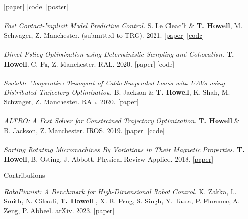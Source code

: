 \documentclass[10pt]{article}
\begin{document}
[\href{https://arxiv.org/abs/2109.04928}{paper}]
[\href{https://github.com/thowell/optimization_dynamics}{code}]
[\href{https://github.com/thowell/cv/blob/master/posters/optimization_dynamics_poster.pdf}{poster}]
\\
\\
\textit{Fast Contact-Implicit Model Predictive Control.} {\color{lightgray} S. Le Cleac'h \&} \textbf{T. Howell}{\color{lightgray}, M. Schwager, Z. Manchester. (submitted to TRO). 2021.}
[\href{https://arxiv.org/abs/2107.05616v2}{paper}]
[\href{https://github.com/thowell/ContactImplicitMPC.jl}{code}]
\\
\\
\textit{Direct Policy Optimization using Deterministic Sampling and Collocation.} \textbf{T. Howell}{\color{lightgray}, C. Fu, Z. Manchester. RAL. 2020.}
[\href{https://arxiv.org/abs/2010.08506v3}{paper}]
[\href{https://github.com/thowell/direct_policy_optimization}{code}]
\\
\\
\textit{Scalable Cooperative Transport of Cable-Suspended Loads with UAVs using Distributed Trajectory Optimization.} {\color{lightgray}B. Jackson \&} \textbf{T. Howell}{\color{lightgray}, K. Shah, M. Schwager, Z. Manchester. RAL. 2020.}
[\href{https://roboticexplorationlab.org/papers/distributed_quads.pdf}{paper}]
\\
\\
\textit{ALTRO: A Fast Solver for Constrained Trajectory Optimization.} \textbf{T. Howell} {\color{lightgray} \& B. Jackson, Z. Manchester. IROS. 2019.}
[\href{https://roboticexplorationlab.org/papers/altro-iros.pdf}{paper}]
[\href{https://github.com/RoboticExplorationLab/TrajectoryOptimization.jl}{code}]
\\
\\
\textit{Sorting Rotating Micromachines By Variations in Their Magnetic Properties.} \textbf{T. Howell}{\color{lightgray}, B. Osting, J. Abbott. Physical Review Applied. 2018.}
[\href{https://journals.aps.org/prapplied/pdf/10.1103/PhysRevApplied.9.054021}{paper}]
\\
\begin{center} Contributions \end{center}
\textit{RoboPianist: A Benchmark for High-Dimensional Robot Control.} {\color{lightgray} K. Zakka, L. Smith, N. Gileadi,} \textbf{T. Howell} {\color{lightgray}, X. B. Peng, S. Singh, Y. Tassa, P. Florence, A. Zeng, P. Abbeel. arXiv. 2023.}
[\href{https://arxiv.org/abs/2304.04150}{paper}]
\\
\end{document}
